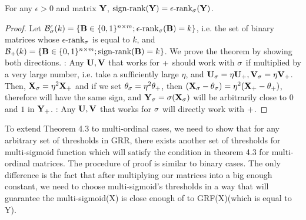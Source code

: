 \documentclass{article}
\begin{document}
\begin{thm:thm}
For any $\epsilon>0$ and matrix $\mathbf{Y}$, $\text{sign-rank}(\mathbf{Y}) = \epsilon\text{-rank}_\sigma(\mathbf{Y})$.
\begin{proof}
Let $\mathcal{B}_\sigma^\epsilon(k)=\{\mathbf{B}\in\{0,1\}^{n\times m}; \epsilon\text{-rank}_\sigma(\mathbf{B})=k\}$, i.e. the set of binary matrices whose $\epsilon\text{-rank}_\sigma$ is equal to $k$, and $\mathcal{B}_+(k)=\{\mathbf{B}\in\{0,1\}^{n\times m}; \text{sign-rank}(\mathbf{B})=k\}$.  We prove the theorem by showing both directions.
\textul{$\Bm_\step\subseteq\Bm_\sigmoid$}:
Any $\mathbf{U},\mathbf{V}$ that works for $+$ should work with $\sigma$ if multiplied by a very large number, i.e. take a sufficiently large $\eta$, and $\mathbf{U}_\sigma=\eta\mathbf{U}_+,\mathbf{V}_\sigma=\eta\mathbf{V}_+$.
Then, $\mathbf{X}_\sigma=\eta^2\mathbf{X}_+$ and if we set $\mathbf{\theta}_\sigma=\eta^2\mathbf{\theta}_+$, then $(\mathbf{X}_\sigma-\mathbf{\theta}_\sigma)=\eta^2(\mathbf{X}_+-\mathbf{\theta}_+)$, therefore will have the same sign, and $\mathbf{Y}_\sigma=\sigma(\mathbf{X}_\sigma)$ will be arbitrarily close to $0$ and $1$ in $\mathbf{Y}_+$.
\textul{$\Bm_\sigmoid\subseteq\Bm_\step$}:
Any $\mathbf{U},\mathbf{V}$ that works for $\sigma$ will directly work with $+$.
\end{proof}
\end{thm:thm}

\begin{thm:rmk}
To extend Theorem 4.3 to multi-ordinal cases, we need to show that for any arbitrary set of thresholds in GRR, there exists another set of thresholds for multi-sigmoid function which will satisfy the condition in theorem 4.3 for multi-ordinal matrices. The procedure of proof is similar to binary cases. The only difference is the fact that after multiplying our matrices into a big enough constant, we need to choose multi-sigmoid’s thresholds in a way that will guarantee the multi-sigmoid(X) is close enough of to GRF(X)(which is equal to Y). 
\end{thm:rmk}
\end{document}
